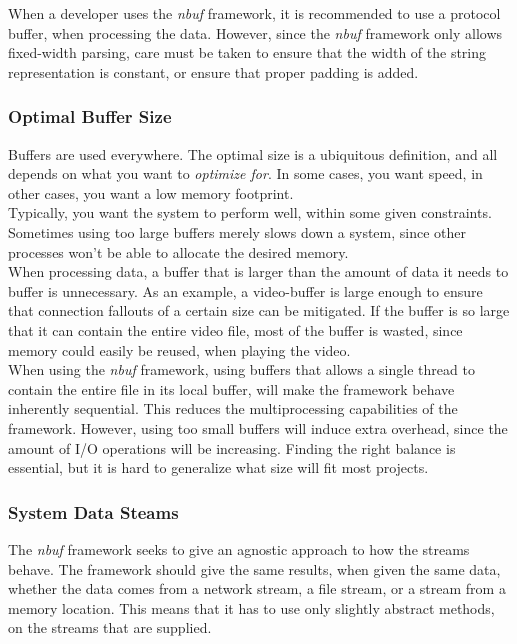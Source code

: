 \documentclass[a4paper]{article}
\newcommand{\nbuf}{\textit{nbuf} }
\begin{document}
When a developer uses the \nbuf framework, it is recommended to use a protocol buffer, when processing the data. However, since the \nbuf framework only allows fixed-width parsing, care must be taken to ensure that the width of the string representation is constant, or ensure that proper padding is added.


\subsubsection{Optimal Buffer Size}
Buffers are used everywhere. The optimal size is a ubiquitous definition, and all depends on what you want to \textit{optimize for}. In some cases, you want speed, in other cases, you want a low memory footprint.\\

Typically, you want the system to perform well, within some given constraints. Sometimes using too large buffers merely slows down a system, since other processes won't be able to allocate the desired memory.\\

When processing data, a buffer that is larger than the amount of data it needs to buffer is unnecessary. As an example, a video-buffer is large enough to ensure that connection fallouts of a certain size can be mitigated. If the buffer is so large that it can contain the entire video file, most of the buffer is wasted, since memory could easily be reused, when playing the video.\\

When using the \nbuf framework, using buffers that allows a single thread to contain the entire file in its local buffer, will make the framework behave inherently sequential. This reduces the multiprocessing capabilities of the framework. However, using too small buffers will induce extra overhead, since the amount of I/O operations will be increasing. Finding the right balance is essential, but it is hard to generalize what size will fit most projects.


\subsubsection{System Data Steams}
The \nbuf framework seeks to give an agnostic approach to how the streams behave. The framework should give the same results, when given the same data, whether the data comes from a network stream, a file stream, or a stream from a memory location. This means that it has to use only slightly abstract methods, on the streams that are supplied.\\
\end{document}
